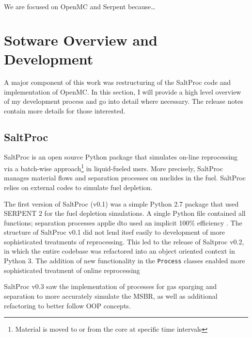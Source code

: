 We are focused on OpenMC and Serpent because\ldots


\section{Sotware Overview and Development}
\label{sec:soft_dev}
A major component of this work was restructuring of the SaltProc code and implementation of OpenMC. In this section, I will provide a high level overview of my development process and go into detail where necessary. The release notes contain more details for those interested.
\subsection{SaltProc}%
\label{sub:saltproc}

SaltProc\cite{rykhlevskii_saltproc_2018} is an open source Python package that simulates on-line reprocessing via a batch-wise approach\footnote{Material is moved to or from the core at specific time intervals} in liquid-fueled \Gls{msr}s. More precisely, SaltProc manages material flows and separation processes on nuclides in the fuel. SaltProc relies on external codes to simulate fuel depletion.

The first version of SaltProc (v0.1) was a simple Python 2.7 package that used SERPENT 2 for the fuel depletion simulations. A single Python file contained all functions; separation processes applie dto  used an implicit 100\% efficiency \cite{rykhlevskii_advanced_2018}. The structure of SaltProc v0.1 did not lend itsef easily to development of more sophisticated treatments of reprocessing. This led to the release of Saltproc v0.2, in which the entire codebase was refactored into an object oriented
context in Python 3. The addition of new functionality in the \verb.Process. classes enabled more sophisticated treatment of online reprocessing \cite{rykhlevskii_fuel_2020} 

SaltProc v0.3 saw the implementation of processes for gas sparging and separation to more accurately simulate the MSBR, as well as additional refactoring to better follow OOP concepts.

